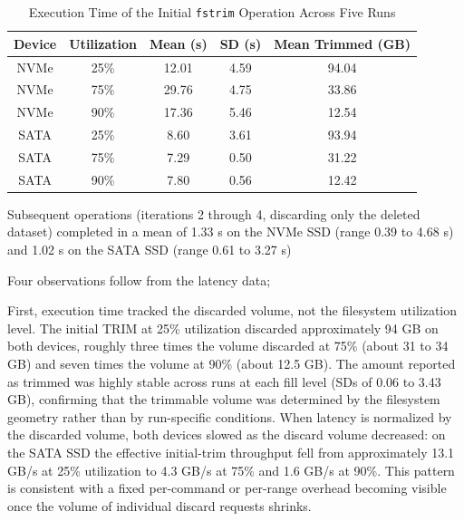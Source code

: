 \begin{table}[H]
    \centering
    \caption{Execution Time of the Initial \texttt{fstrim} Operation Across Five Runs}
    \label{tab:fstrim-execution-time}
    
    \begin{tabular}{c c c c c}
        \toprule
        \textbf{Device} & \textbf{Utilization} & \textbf{Mean (s)} &
        \textbf{SD (s)}  &  \textbf{Mean Trimmed (GB)} \\
        \midrule
        
        NVMe & 25\% & 12.01 & 4.59  & 94.04 \\
        NVMe & 75\% & 29.76 & 4.75  & 33.86 \\
        NVMe & 90\% & 17.36 & 5.46  & 12.54 \\
        
        SATA & 25\% & 8.60  & 3.61  & 93.94 \\
        SATA & 75\% & 7.29  & 0.50  & 31.22 \\
        SATA & 90\% & 7.80  & 0.56  & 12.42 \\
        
        \bottomrule
    \end{tabular}
\end{table}
Subsequent operations (iterations 2 through 4, discarding only the deleted dataset) completed in a mean of 1.33 s on the NVMe SSD (range 0.39 to 4.68 s) and 1.02 s on 
the SATA SSD (range 0.61 to 3.27 s)

Four observations follow from the latency data; 

First, execution time tracked the discarded volume, not the filesystem utilization level. The initial TRIM at 25\% utilization discarded approximately 94 GB on both 
devices, roughly three times the volume discarded at 75\% (about 31 to 34 GB) and seven times the volume at 90\% (about 12.5 GB). The amount reported as trimmed was 
highly stable across runs at each fill level (SDs of 0.06 to 3.43 GB), confirming that the trimmable volume was determined by the filesystem geometry rather than by 
run-specific conditions. When latency is normalized by the discarded volume, both devices slowed as the discard volume decreased: on the SATA SSD the effective 
initial-trim throughput fell from approximately 13.1 GB/s at 25\% utilization to 4.3 GB/s at 75\% and 1.6 GB/s at 90\%. This pattern is consistent with a fixed 
per-command or per-range overhead becoming visible once the volume of individual discard requests shrinks.

